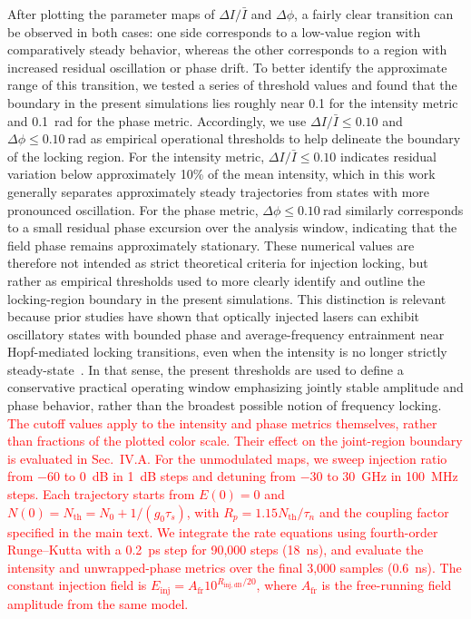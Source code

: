 \documentclass[
 aip,
 apl,
 amsmath,amssymb,
 preprint,
 floatfix,
]{revtex4-1}
\begin{document}
After plotting the parameter maps of $\Delta I/\bar{I}$ and $\Delta\phi$, a fairly clear transition can be observed in both cases: one side corresponds to a low-value region with comparatively steady behavior, whereas the other corresponds to a region with increased residual oscillation or phase drift. To better identify the approximate range of this transition, we tested a series of threshold values and found that the boundary in the present simulations lies roughly near 0.1 for the intensity metric and 0.1~rad for the phase metric. Accordingly, we use $\Delta I/\bar{I}\le 0.10$ and $\Delta\phi\le 0.10~\mathrm{rad}$ as empirical operational thresholds to help delineate the boundary of the locking region. For the intensity metric, $\Delta I/\bar{I}\le 0.10$ indicates residual variation below approximately 10\% of the mean intensity, which in this work generally separates approximately steady trajectories from states with more pronounced oscillation. For the phase metric, $\Delta\phi\le 0.10~\mathrm{rad}$ similarly corresponds to a small residual phase excursion over the analysis window, indicating that the field phase remains approximately stationary. These numerical values are therefore not intended as strict theoretical criteria for injection locking, but rather as empirical thresholds used to more clearly identify and outline the locking-region boundary in the present simulations. This distinction is relevant because prior studies have shown that optically injected lasers can exhibit oscillatory states with bounded phase and average-frequency entrainment near Hopf-mediated locking transitions, even when the intensity is no longer strictly steady-state~\cite{Kelleher2012PRE_BoundedPhase,Pausch2012NJP_QDInjectionDynamics}. In that sense, the present thresholds are used to define a conservative practical operating window emphasizing jointly stable amplitude and phase behavior, rather than the broadest possible notion of frequency locking.
\textcolor{red}{The cutoff values apply to the intensity and phase metrics themselves, rather than fractions of the plotted color scale. Their effect on the joint-region boundary is evaluated in Sec.~IV.A.}
\textcolor{red}{For the unmodulated maps, we sweep injection ratio from $-60$ to $0$~dB in 1~dB steps and detuning from $-30$ to $30$~GHz in 100~MHz steps. Each trajectory starts from $E(0)=0$ and $N(0)=N_{\mathrm{th}}=N_0+1/(g_0\tau_s)$, with $R_p=1.15N_{\mathrm{th}}/\tau_n$ and the coupling factor specified in the main text. We integrate the rate equations using fourth-order Runge--Kutta with a 0.2~ps step for 90,000 steps (18~ns), and evaluate the intensity and unwrapped-phase metrics over the final 3,000 samples (0.6~ns). The constant injection field is $E_{\mathrm{inj}}=A_{\mathrm{fr}}10^{R_{\mathrm{inj,dB}}/20}$, where $A_{\mathrm{fr}}$ is the free-running field amplitude from the same model.}
\end{document}
